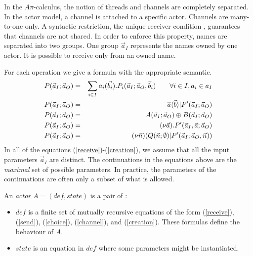 \documentclass[a4paper]{report}
\numberwithin{algorithm}{chapter}
\begin{document}
In the $A\pi$-calculus, the notion of threads and channels are completely separated.
In the actor model, a channel is attached to a specific actor.
Channels are many-to-one only.
A syntactic restriction, the unique receiver condition \cite{DBLP:journals/tcs/Amadio00,DBLP:journals/njc/AmadioM02}, guarantees that channels are not shared.
In order to enforce this property, names are separated into two groups.
One group $\vec a_I$ represents the names owned by one actor.
It is possible to receive only from an owned name.

For each operation we give a formula with the appropriate semantic.
\begin{eqnarray}
\label{receive}     P(\vec a_I; \vec a_O) & = & \sum_{i \in I} a_i (\vec{b_i}).P_i(\vec a_I ;\vec a_O, \vec b_i) \hspace{7mm} \forall i \in I, a_i \in a_I \\
\label{send}        P(\vec a_I; \vec a_O) & = & \overline{a}\langle \vec{b} \rangle | P^\prime(\vec a_I ;\vec a_O) \\
\label{choice}      P(\vec a_I; \vec a_O) & = & A(\vec a_I; \vec a_O) \oplus B(\vec a_I; \vec a_O) \\
\label{channel}     P(\vec a_I; \vec a_O) & = & (\nu \vec a).P^\prime(\vec a_I, \vec a; \vec a_O) \\
\label{creation}    P(\vec a_I; \vec a_O) & = & (\nu \vec n)(Q(\vec n;\emptyset) | P^\prime(\vec a_I ; \vec a_O , \vec n)) 
\end{eqnarray}
In all of the equations (\ref{receive})-(\ref{creation}), we assume that all the input parameters $\vec a_I$ are distinct.
The continuations in the equations above are the \emph{maximal} set of possible parameters.
In practice, the parameters of the continuations are often only a subset of what is allowed.

\begin{define}[Actor]
\label{defActor}
An \emph{actor} $A = (\mathit{def},\mathit{state})$ is a pair of :
\begin{itemize}
\item $\mathit{def}$ is a finite set of mutually recursive equations of the form (\ref{receive}), (\ref{send}), (\ref{choice}), (\ref{channel}), and (\ref{creation}).
These formulas define the behaviour of $A$.
\item $\mathit{state}$ is an equation in $\mathit{def}$ where some parameters might be instantiated.
\end{itemize}
\end{define}
\end{document}
